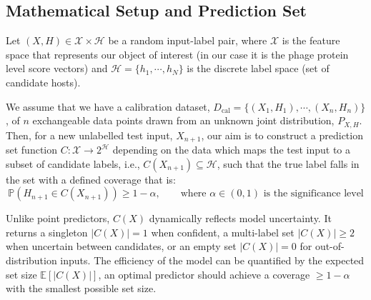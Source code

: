 \subsection{Mathematical Setup and Prediction Set}
\label{sec2.3.1: setup}
Let $(X,H) \in \mathcal{X} \times \mathcal{H}$ be a random input-label pair, where $\mathcal{X}$ is the feature 
space that represents our object of interest (in our case it is the phage protein level score vectors) and $\mathcal{H} = 
\{h_1, \cdots, h_N\}$ is the discrete label space (set of candidate hosts). 

We assume that we have a calibration dataset, $D_{\text{cal}} = \{(X_1, H_1), \cdots , (X_n, H_n)\}$, of $n$ 
exchangeable data points drawn from an unknown joint distribution, $P_{X,H}$. Then, for a new unlabelled test input, 
$X_{n+1}$, our aim is to construct a prediction set function $C: \mathcal{X} \rightarrow 2^{\mathcal{H}}$ depending on 
the data which maps the test input to a subset of candidate labels, i.e., $C(X_{n+1}) \subseteq \mathcal{H}$, such that 
the true label falls in the set with a defined coverage that is:
$$\mathbb{P}(H_{n+1} \in C(X_{n+1})) \geq 1 - \alpha,  \qquad \text{where } \alpha \in (0,1) \text{ is the significance level} $$  



Unlike point predictors, $C(X)$ dynamically reflects model uncertainty. It returns a singleton $|C(X)| = 1$ 
when confident, a multi-label set $|C(X)| \ge 2$ when uncertain between candidates, or an empty set $|C(X)| = 0$ for 
out-of-distribution inputs. The efficiency of the model can be quantified by the expected set size $\mathbb{E}[|C(X)|]$, 
an optimal predictor should achieve a coverage $\geq 1-\alpha$ with the smallest possible set size.



